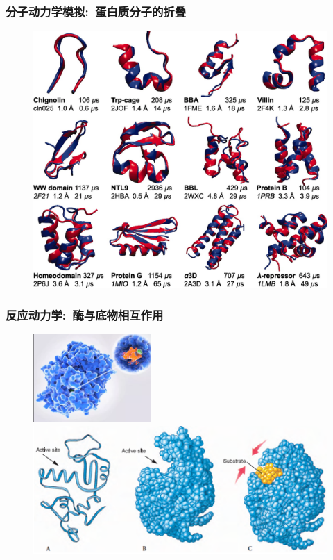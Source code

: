 %
\frame
{
	\frametitle{分子动力学模拟:~蛋白质分子的折叠}
\begin{figure}[h!]
\centering
\vspace{-13.5pt}
\includegraphics[height=0.75\textwidth,width=1.0\textwidth,viewport=0 0 1290 1130,clip]{Figures/Protein-folding.jpeg}
\label{Protein-folding_2}
\end{figure}
}

\frame
{
	\frametitle{反应动力学:~酶与底物相互作用}
\begin{figure}[h!]
\centering
\vspace{-10.5pt}
\includegraphics[height=0.30\textwidth,width=0.4\textwidth,viewport=0 0 880 600,clip]{Figures/Active_site_model.png}
\includegraphics[height=0.37\textwidth,width=1.0\textwidth,viewport=0 0 460 200,clip]{Figures/enzyme-substrate-2.png}
\label{enzyme-substrate}
\end{figure}
}

